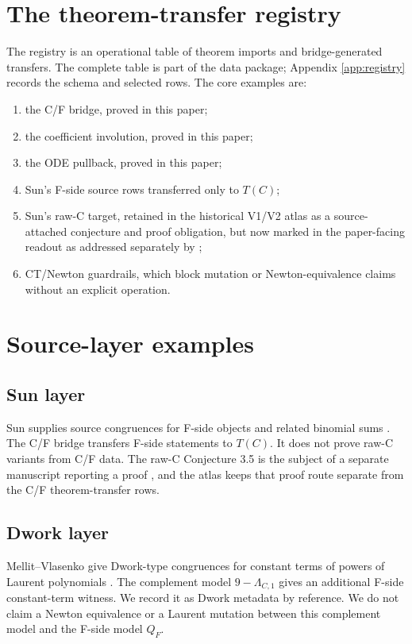 \documentclass[11pt,a4paper]{article}
\begin{document}
\section{The theorem-transfer registry}
\label{sec:registry}

The registry is an operational table of theorem imports and bridge-generated
transfers.  The complete table is part of the data package; Appendix
\ref{app:registry} records the schema and selected rows.  The core examples
are:
\begin{enumerate}
\item the C/F bridge, proved in this paper;
\item the coefficient involution, proved in this paper;
\item the ODE pullback, proved in this paper;
\item Sun's F-side source rows transferred only to $T(C)$;
\item Sun's raw-C target, retained in the historical V1/V2 atlas as a
  source-attached conjecture and proof obligation, but now marked in the
  paper-facing readout as addressed separately by
  \cite{babanskyy_2026_sun35_bridge};
\item CT/Newton guardrails, which block mutation or Newton-equivalence claims
  without an explicit operation.
\end{enumerate}

\section{Source-layer examples}
\label{sec:source-layers}

\subsection{Sun layer}

Sun supplies source congruences for F-side objects and related binomial sums
\cite{sun_2022_supercongruences}.  The C/F bridge transfers F-side statements
to $T(C)$.  It does not prove raw-C variants from C/F data.  The raw-C
Conjecture 3.5 is the subject of a separate manuscript reporting a proof
\cite{babanskyy_2026_sun35_bridge}, and the atlas keeps that proof route
separate from the C/F theorem-transfer rows.

\subsection{Dwork layer}

Mellit--Vlasenko give Dwork-type congruences for constant terms of powers of
Laurent polynomials \cite{mellit_vlasenko_2015_dwork}.  The complement model
$9-\Lambda_{C,1}$ gives an additional F-side constant-term witness.  We record it
as Dwork metadata by reference.  We do not claim a Newton equivalence or a
Laurent mutation between this complement model and the F-side model $Q_F$.
\end{document}
